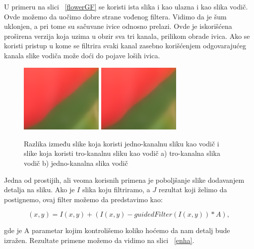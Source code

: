 \documentclass[a4paper,12pt,titlepage]{article}
\begin{document}
U primeru na slici ~\ref{flowerGF} se koristi ista slika i kao ulazna i kao slika vodič. Ovde možemo da uočimo dobre strane vođenog filtera. Vidimo da je šum uklonjen, a pri tome su sačuvane ivice odnosno prelazi. Ovde je iskorišćena proširena verzija koja uzima u obzir sva tri kanala, prilikom obrade ivica. Ako se koristi pristup u kome se filtrira svaki kanal zasebno korišćenjem odgovarajućeg kanala slike vodiča može doći do pojave loših ivica. 

\begin{figure}[ht!]
\centering
\includegraphics[width=40mm]{img/zoom1.png}
\includegraphics[width=40mm]{img/zoom2.png}
\caption{Razlika između slike koja koristi jedno-kanalnu sliku kao vodič i slike koja koristi tro-kanalnu sliku kao vodič a) tro-kanalna slika vodič b) jedno-kanalna slika vodič }
\label{overflow}
\end{figure}

Jedna od prostijih, ali veoma korisnih primena je poboljšanje slike dodavanjem detalja na sliku. Ako je $I$ slika koju filtriramo, a $J$ rezultat koji želimo da postignemo, ovaj filter možemo da predstavimo kao:

\begin{equation}\label{eq:enh}
(x, y) = I(x, y) + (I(x, y) - guidedFilter(I(x, y)) * A),
\end{equation}

gde je A parametar kojim kontrolišemo koliko hoćemo da nam detalj bude izražen. Rezultate primene možemo da vidimo na slici ~\ref{enha}.
\end{document}
